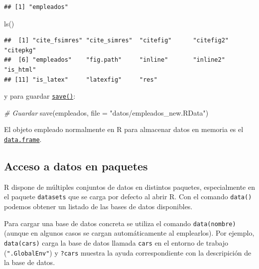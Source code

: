 \documentclass[
]{book}
\newenvironment{Shaded}{\begin{snugshade}}{\end{snugshade}}
\newcommand{\AttributeTok}[1]{\textcolor[rgb]{0.77,0.63,0.00}{#1}}
\newcommand{\CommentTok}[1]{\textcolor[rgb]{0.56,0.35,0.01}{\textit{#1}}}
\newcommand{\FunctionTok}[1]{\textcolor[rgb]{0.00,0.00,0.00}{#1}}
\newcommand{\NormalTok}[1]{#1}
\newcommand{\StringTok}[1]{\textcolor[rgb]{0.31,0.60,0.02}{#1}}
\theoremstyle{break}
\theoremstyle{nonumberplain}
\begin{document}
\begin{verbatim}
## [1] "empleados"
\end{verbatim}

\begin{Shaded}
\begin{Highlighting}[]
\FunctionTok{ls}\NormalTok{()}
\end{Highlighting}
\end{Shaded}

\begin{verbatim}
##  [1] "cite_fsimres" "cite_simres"  "citefig"      "citefig2"     "citepkg"     
##  [6] "empleados"    "fig.path"     "inline"       "inline2"      "is_html"     
## [11] "is_latex"     "latexfig"     "res"
\end{verbatim}

y para guardar \href{https://www.rdocumentation.org/packages/base/versions/3.6.1/topics/save}{\texttt{save()}}:

\begin{Shaded}
\begin{Highlighting}[]
\CommentTok{\# Guardar}
\FunctionTok{save}\NormalTok{(empleados, }\AttributeTok{file =} \StringTok{"datos/empleados\_new.RData"}\NormalTok{)}
\end{Highlighting}
\end{Shaded}

El objeto empleado normalmente en R para almacenar datos en memoria
es el \href{https://www.rdocumentation.org/packages/base/versions/3.6.1/topics/data.frame}{\texttt{data.frame}}.

\hypertarget{acceso-a-datos-en-paquetes}{%
\subsection{Acceso a datos en paquetes}\label{acceso-a-datos-en-paquetes}}

R dispone de múltiples conjuntos de datos en distintos paquetes, especialmente en el paquete \texttt{datasets}
que se carga por defecto al abrir R.
Con el comando \texttt{data()} podemos obtener un listado de las bases de datos disponibles.

Para cargar una base de datos concreta se utiliza el comando
\texttt{data(nombre)} (aunque en algunos casos se cargan automáticamente al emplearlos).
Por ejemplo, \texttt{data(cars)} carga la base de datos llamada \texttt{cars} en el entorno de trabajo (\texttt{".GlobalEnv"})
y \texttt{?cars} muestra la ayuda correspondiente con la descripición de la base de datos.
\end{document}
